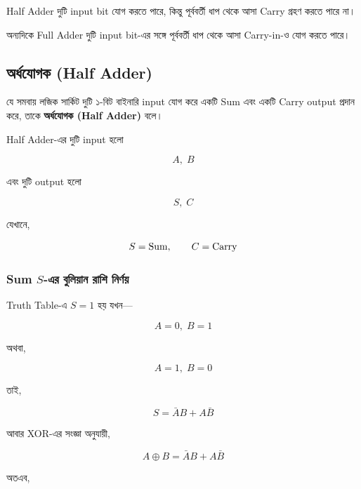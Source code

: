 \textenglish{Half Adder} দুটি \textenglish{input bit} যোগ করতে পারে,
কিন্তু পূর্ববর্তী ধাপ থেকে আসা \textenglish{Carry} গ্রহণ করতে পারে না।

অন্যদিকে \textenglish{Full Adder} দুটি \textenglish{input bit}-এর সঙ্গে
পূর্ববর্তী ধাপ থেকে আসা \textenglish{Carry-in}-ও যোগ করতে পারে।



\subsection{অর্ধযোগক
(\textenglish{Half Adder})}

\par\begingroup

যে সমবায় লজিক সার্কিট দুটি ১-বিট বাইনারি
\textenglish{input} যোগ করে একটি \textenglish{Sum}
এবং একটি \textenglish{Carry output} প্রদান করে,
তাকে \textbf{অর্ধযোগক (\textenglish{Half Adder})} বলে।
\par\endgroup


\textenglish{Half Adder}-এর দুটি \textenglish{input} হলো

\[
A,\;B
\]

এবং দুটি \textenglish{output} হলো

\[
S,\;C
\]

যেখানে,

\[
S=\text{\textenglish{Sum}},
\qquad
C=\text{\textenglish{Carry}}
\]



\subsubsection*{\textenglish{Sum} \(S\)-এর বুলিয়ান রাশি নির্ণয়}

\textenglish{Truth Table}-এ \(S=1\) হয় যখন—

\[
A=0,\;B=1
\]

অথবা,

\[
A=1,\;B=0
\]

তাই,

\[
S=\bar A B+A\bar B
\]

আবার \textenglish{XOR}-এর সংজ্ঞা অনুযায়ী,

\[
A\oplus B
=
\bar A B+A\bar B
\]

অতএব,

